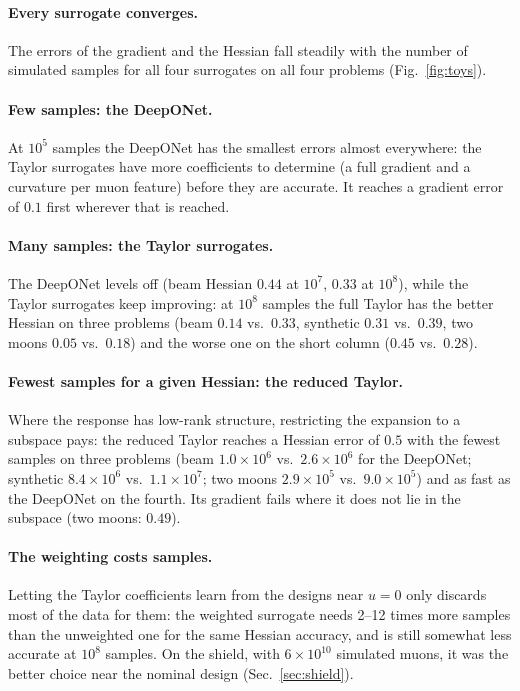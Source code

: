 \documentclass[11pt,a4paper]{article}
\begin{document}
\paragraph{Every surrogate converges.} The errors of the gradient and the Hessian fall steadily
with the number of simulated samples for all four surrogates on all four problems
(Fig.~\ref{fig:toys}).

\paragraph{Few samples: the DeepONet.} At $10^5$ samples the DeepONet has the smallest errors
almost everywhere: the Taylor surrogates have more coefficients to determine (a full
gradient and a curvature per muon feature) before they are accurate. It reaches a gradient error of
$0.1$ first wherever that is reached.

\paragraph{Many samples: the Taylor surrogates.} The DeepONet levels off (beam Hessian $0.44$ at
$10^7$, $0.33$ at $10^8$), while the Taylor surrogates keep improving: at $10^8$ samples the full
Taylor has the better Hessian on three problems (beam $0.14$ vs.\ $0.33$, synthetic $0.31$ vs.\
$0.39$, two moons $0.05$ vs.\ $0.18$) and the worse one on the short column ($0.45$ vs.\ $0.28$).

\paragraph{Fewest samples for a given Hessian: the reduced Taylor.} Where the response has
low-rank structure, restricting the expansion to a subspace pays: the reduced Taylor reaches a
Hessian error of $0.5$ with the fewest samples on three problems (beam $1.0\times10^6$ vs.\
$2.6\times10^6$ for the DeepONet; synthetic $8.4\times10^6$ vs.\ $1.1\times10^7$; two moons
$2.9\times10^5$ vs.\ $9.0\times10^5$) and as fast as the DeepONet on the fourth. Its gradient fails
where it does not lie in the subspace (two moons: $0.49$).

\paragraph{The weighting costs samples.} Letting the Taylor coefficients learn from the designs
near $u=0$ only discards most of the data for them: the weighted surrogate needs 2--12 times more
samples than the unweighted one for the same Hessian accuracy, and is still somewhat less accurate
at $10^8$ samples. On the shield, with $6\times10^{10}$ simulated muons, it was the better choice
near the nominal design (Sec.~\ref{sec:shield}).
\end{document}
